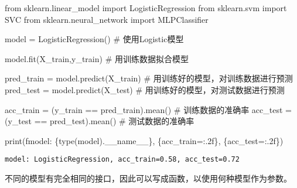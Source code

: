 \documentclass[
  letterpaper,
  DIV=11,
  numbers=noendperiod]{scrreprt}
\newenvironment{Shaded}{\begin{snugshade}}{\end{snugshade}}
\newcommand{\BuiltInTok}[1]{\textcolor[rgb]{0.00,0.23,0.31}{#1}}
\newcommand{\CommentTok}[1]{\textcolor[rgb]{0.37,0.37,0.37}{#1}}
\newcommand{\ImportTok}[1]{\textcolor[rgb]{0.00,0.46,0.62}{#1}}
\newcommand{\NormalTok}[1]{\textcolor[rgb]{0.00,0.23,0.31}{#1}}
\newcommand{\OperatorTok}[1]{\textcolor[rgb]{0.37,0.37,0.37}{#1}}
\newcommand{\SpecialCharTok}[1]{\textcolor[rgb]{0.37,0.37,0.37}{#1}}
\newcommand{\SpecialStringTok}[1]{\textcolor[rgb]{0.13,0.47,0.30}{#1}}
\newcommand{\VariableTok}[1]{\textcolor[rgb]{0.07,0.07,0.07}{#1}}
\begin{document}
\begin{Shaded}
\begin{Highlighting}[]
\ImportTok{from}\NormalTok{ sklearn.linear\_model }\ImportTok{import}\NormalTok{ LogisticRegression}
\ImportTok{from}\NormalTok{ sklearn.svm }\ImportTok{import}\NormalTok{ SVC}
\ImportTok{from}\NormalTok{ sklearn.neural\_network }\ImportTok{import}\NormalTok{ MLPClassifier}

\NormalTok{model }\OperatorTok{=}\NormalTok{ LogisticRegression() }\CommentTok{\# 使用Logistic模型}


\NormalTok{model.fit(X\_train,y\_train) }\CommentTok{\# 用训练数据拟合模型}

\NormalTok{pred\_train }\OperatorTok{=}\NormalTok{ model.predict(X\_train) }\CommentTok{\# 用训练好的模型，对训练数据进行预测}
\NormalTok{pred\_test }\OperatorTok{=}\NormalTok{ model.predict(X\_test) }\CommentTok{\# 用训练好的模型，对测试数据进行预测}

\NormalTok{acc\_train }\OperatorTok{=}\NormalTok{ (y\_train }\OperatorTok{==}\NormalTok{ pred\_train).mean() }\CommentTok{\# 训练数据的准确率}
\NormalTok{acc\_test }\OperatorTok{=}\NormalTok{ (y\_test }\OperatorTok{==}\NormalTok{ pred\_test).mean() }\CommentTok{\# 测试数据的准确率}

\BuiltInTok{print}\NormalTok{(}\SpecialStringTok{f\textquotesingle{}model: }\SpecialCharTok{\{}\BuiltInTok{type}\NormalTok{(model)}\SpecialCharTok{.}\VariableTok{\_\_name\_\_}\SpecialCharTok{\}}\SpecialStringTok{, }\SpecialCharTok{\{}\NormalTok{acc\_train}\OperatorTok{=}\SpecialCharTok{:.2f\}}\SpecialStringTok{, }\SpecialCharTok{\{}\NormalTok{acc\_test}\OperatorTok{=}\SpecialCharTok{:.2f\}}\SpecialStringTok{\textquotesingle{}}\NormalTok{)}
\end{Highlighting}
\end{Shaded}

\begin{verbatim}
model: LogisticRegression, acc_train=0.58, acc_test=0.72
\end{verbatim}

不同的模型有完全相同的接口，因此可以写成函数，以使用何种模型作为参数。
\end{document}
